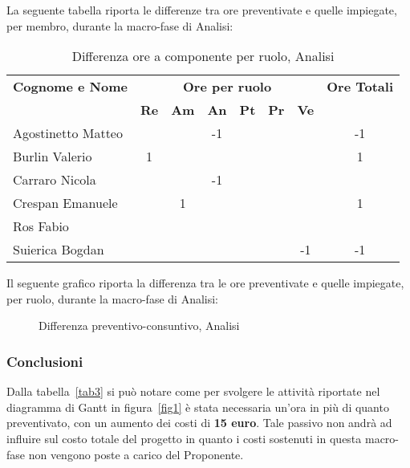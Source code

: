\noindent La seguente tabella riporta le differenze tra ore preventivate e quelle impiegate, per membro, durante la macro-fase di Analisi: 
\begin{table}[h]
\centering
\begin{tabular}{|l|c|c|c|c|c|c|c|}
	\toprule
	\textbf{Cognome e Nome} & \multicolumn{6}{c}{\textbf{Ore per ruolo}} & \textbf{Ore Totali} \\
	& \textbf{Re} & \textbf{Am} & \textbf{An} & \textbf{Pt} & \textbf{Pr} & \textbf{Ve} & \\
		
	\midrule
	Agostinetto Matteo & & & -1 & & & & -1 \\
	Burlin Valerio & 1 & & & & & & 1 \\ 
	Carraro Nicola & & & -1 & & & & \\
	Crespan Emanuele & & 1 & & & & & 1 \\
	Ros Fabio & & & & & & & \\
	Suierica Bogdan & & & & & & -1 & -1 \\
		
	\bottomrule
\end{tabular}
\caption{Differenza ore a componente per ruolo, Analisi}
\end{table}

\newpage
\noindent Il seguente grafico riporta la differenza tra le ore preventivate e quelle impiegate, per ruolo, durante la macro-fase di Analisi:
\begin{figure}[h]
\centering
{}
\caption{Differenza preventivo-consuntivo, Analisi}
\end{figure}

\subsubsection{Conclusioni}
Dalla tabella~\ref{tab3} si può notare come per svolgere le attività riportate nel diagramma di Gantt in figura~\ref{fig1} è stata necessaria un'ora in più di quanto preventivato, con un aumento dei costi di \textbf{15 euro}. Tale passivo non andrà ad influire sul costo totale del progetto in quanto i costi sostenuti in questa macro-fase non vengono poste a carico del Proponente.  